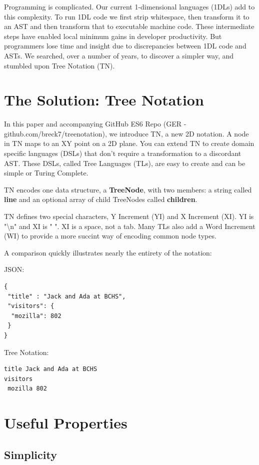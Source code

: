 \documentclass[journal]{IEEEtran}
\begin{document}
Programming is complicated. Our current 1-dimensional languages (1DLs) add to this complexity. To run 1DL code we first strip whitespace, then transform it to an AST and then transform that to executable machine code. These intermediate steps have enabled local minimum gains in developer productivity. But programmers lose time and insight due to discrepancies between 1DL code and ASTs. We searched, over a number of years, to discover a simpler way, and stumbled upon Tree Notation (TN).

\section{The Solution: Tree Notation}

In this paper and accompanying GitHub ES6 Repo (GER - github.com/breck7/treenotation), we introduce TN, a new 2D notation. A node in TN maps to an XY point on a 2D plane. You can extend TN to create domain specific languages (DSLs) that don't require a transformation to a discordant AST. These DSLs, called Tree Languages (TLs), are easy to create and can be simple or Turing Complete.

TN encodes one data structure, a \textbf{TreeNode}, with two members: a string called \textbf{line} and an optional array of child TreeNodes called \textbf{children}.

TN defines two special characters, Y Increment (YI) and X Increment (XI). YI is "\textbackslash n" and XI is " ".  XI is a space, not a tab. Many TLs also add a Word Increment (WI) to provide a more succint way of encoding common node types.

A comparison quickly illustrates nearly the entirety of the notation:

JSON:

\begin{lstlisting}
{
 "title" : "Jack and Ada at BCHS",
 "visitors": {
  "mozilla": 802
 }
}
\end{lstlisting}

Tree Notation:

\begin{lstlisting}
title Jack and Ada at BCHS
visitors
 mozilla 802
\end{lstlisting}

\section{Useful Properties}

\subsection{Simplicity}
\end{document}
